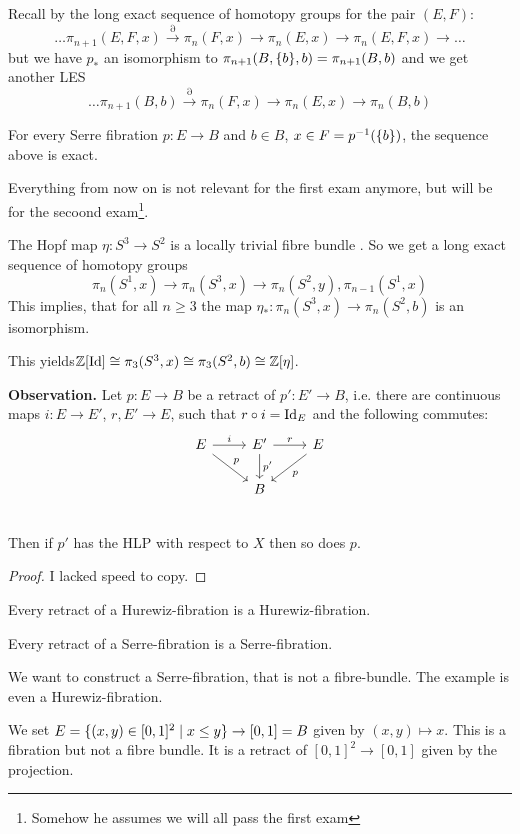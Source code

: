 \documentclass[language=english]{TemplateLecture}
\begin{document}
Recall by the long exact sequence of homotopy groups for the pair \((E,F)\):
\[\dots \pi_{n+1}(E,F,x) \xrightarrow{\partial} \pi_n(F,x) \to \pi_n(E,x) \to \pi_n(E,F,x) \to \dots\]
but we have \(p_*\) an isomorphism to \(\pi_{n+1}(B, \{b\}, b) = \pi_{n+1}(B, b)\) and we get another LES
\[\dots \pi_{n+1}(B,b) \xrightarrow{\partial} \pi_n(F,x) \to \pi_n(E,x) \to \pi_n(B,b)\]

\begin{corollary}
    For every Serre fibration \(p \colon E \to B\) and \(b \in B\), \(x \in F = p^{-1}(\{b\})\), the sequence above is exact.
\end{corollary}



Everything from now on is not relevant for the first exam anymore, but will be for the secoond exam\footnote{Somehow he assumes we will all pass the first exam}.

The Hopf map \(\eta\colon S^3 \to S^2\) is a locally trivial fibre bundle . So we get a long exact sequence of homotopy groups
\[\pi_n(S^1,x) \to \pi_n(S^3, x) \to \pi_n(S^2, y), \pi_{n-1}(S^1,x)\]
This implies, that for all \(n \geq 3\) the map \(\eta_*\colon \pi_n(S^3, x) \to \pi_n(S^2, b)\) is an isomorphism.

This yields\(\mathbb{Z}[\operatorname{Id}] \cong \pi_3(S^3, x) \cong \pi_3(S^2, b) \cong \mathbb{Z}[\eta]\).

\textbf{Observation.} Let \(p\colon E \to B\) be a retract of \(p'\colon E' \to B\), i.e. there are continuous maps \(i \colon E \to E'\), \(r, E'\to E\), such that \(r\circ i = \operatorname{Id}_E\) and the following commutes:
\[\begin{tikzcd}
    E \ar[rd, "p"] \ar[r, "i"] & E' \ar[d, "p'"] \ar[r, "r"] & E \ar[dl, "p"] \\
    & B & \\
\end{tikzcd}\]
Then if \(p'\) has the HLP with respect to \(X\) then so does \(p\).

\begin{proof}
    I lacked speed to copy.
\end{proof}

\begin{corollary}
    Every retract of a Hurewiz-fibration is a Hurewiz-fibration.

    Every retract of a Serre-fibration is a Serre-fibration.
\end{corollary}

\begin{example}
    We want to construct a Serre-fibration, that is not a fibre-bundle. The example is even a Hurewiz-fibration.

    We set \(E = \{(x,y) \in [0,1]^2 \mid x \leq y\} \to [0,1] = B\) given by \((x,y) \mapsto x\). This is a fibration but not a fibre bundle. It is a retract of \([0,1]^2 \to [0,1]\) given by the projection.
\end{example}
\end{document}
